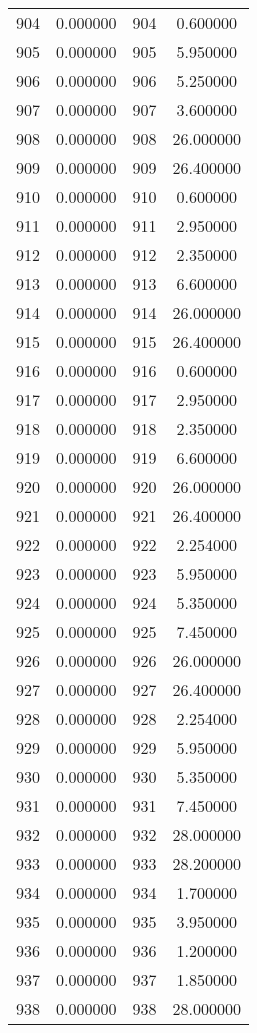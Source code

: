 \documentclass[12pt]{article}
\begin{document}
\begin{longtable}{@{}cccc@{}}
904 & 0.000000 & 904 & 0.600000 \\
905 & 0.000000 & 905 & 5.950000 \\
906 & 0.000000 & 906 & 5.250000 \\
907 & 0.000000 & 907 & 3.600000 \\
908 & 0.000000 & 908 & 26.000000 \\
909 & 0.000000 & 909 & 26.400000 \\
910 & 0.000000 & 910 & 0.600000 \\
911 & 0.000000 & 911 & 2.950000 \\
912 & 0.000000 & 912 & 2.350000 \\
913 & 0.000000 & 913 & 6.600000 \\
914 & 0.000000 & 914 & 26.000000 \\
915 & 0.000000 & 915 & 26.400000 \\
916 & 0.000000 & 916 & 0.600000 \\
917 & 0.000000 & 917 & 2.950000 \\
918 & 0.000000 & 918 & 2.350000 \\
919 & 0.000000 & 919 & 6.600000 \\
920 & 0.000000 & 920 & 26.000000 \\
921 & 0.000000 & 921 & 26.400000 \\
922 & 0.000000 & 922 & 2.254000 \\
923 & 0.000000 & 923 & 5.950000 \\
924 & 0.000000 & 924 & 5.350000 \\
925 & 0.000000 & 925 & 7.450000 \\
926 & 0.000000 & 926 & 26.000000 \\
927 & 0.000000 & 927 & 26.400000 \\
928 & 0.000000 & 928 & 2.254000 \\
929 & 0.000000 & 929 & 5.950000 \\
930 & 0.000000 & 930 & 5.350000 \\
931 & 0.000000 & 931 & 7.450000 \\
932 & 0.000000 & 932 & 28.000000 \\
933 & 0.000000 & 933 & 28.200000 \\
934 & 0.000000 & 934 & 1.700000 \\
935 & 0.000000 & 935 & 3.950000 \\
936 & 0.000000 & 936 & 1.200000 \\
937 & 0.000000 & 937 & 1.850000 \\
938 & 0.000000 & 938 & 28.000000 \\

\end{longtable}
\end{document}
